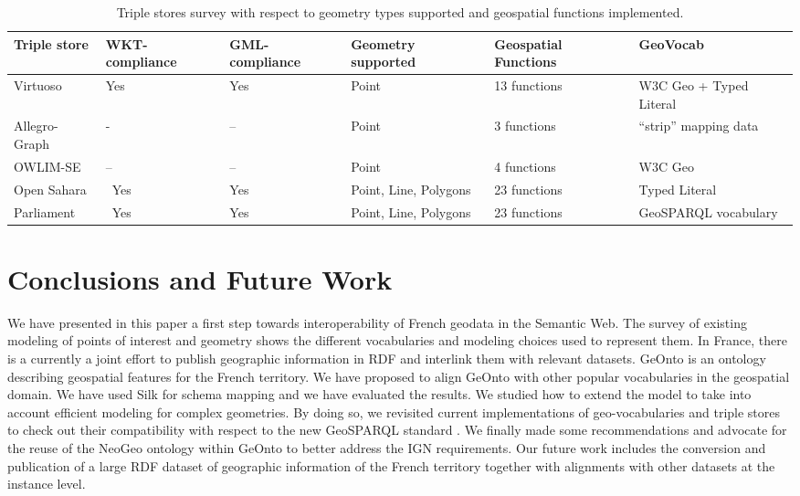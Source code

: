 \documentclass[a4paper,11pt]{report}
\begin{document}
\begin{table}
 \begin{tabularx}{\textwidth}{|X|X|X|X|X|l|}
 \hline
 \textbf{Triple store} & WKT-compliance & GML-compliance & Geometry supported  & Geospatial Functions & GeoVocab \\ \hline
 Virtuoso & Yes & Yes & Point & 13 functions & W3C Geo + Typed Literal  \\ \hline
 Allegro-Graph & \-- & -- & Point & 3 functions & ``strip'' mapping data \\ \hline
 OWLIM-SE & -- & -- & Point & 4 functions & W3C Geo\\ \hline
 Open Sahara & \ Yes & Yes & Point, Line, Polygons & 23 functions  & Typed Literal \\ \hline
 Parliament & \ Yes & Yes & Point, Line, Polygons & 23 functions  &  GeoSPARQL vocabulary\\ \hline
 \end{tabularx}
\caption{Triple stores survey with respect to geometry types supported and geospatial functions implemented.}
\label{tab:triplestore}
\end{table}



\section{Conclusions and Future Work}                                       \label{sec:conclusion}
We have presented in this paper a first step towards interoperability of French geodata in the Semantic Web. The survey of existing modeling of points of interest and geometry shows the different vocabularies and modeling choices used to represent them. In France, there is a currently a joint effort to publish geographic information in RDF and interlink them with relevant datasets. GeOnto is an ontology describing geospatial features for the French territory. We have proposed to align GeOnto with other popular vocabularies in the geospatial domain. We have used Silk for schema mapping and we have evaluated the results. We studied how to extend the model to take into account efficient modeling for complex geometries. By doing so, we revisited current implementations of geo-vocabularies and triple stores to check out their compatibility with respect to the new GeoSPARQL standard . We finally made some recommendations and advocate for the reuse of the NeoGeo ontology within GeOnto to better address the IGN requirements. Our future work includes the conversion and publication of a large RDF dataset of geographic information of the French territory together with alignments with other datasets at the instance level.
\end{document}
